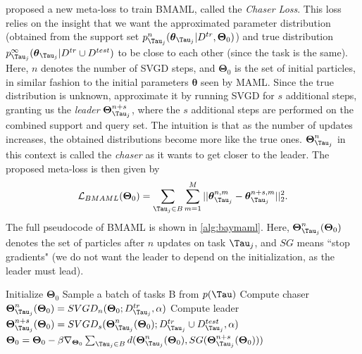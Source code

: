  proposed a new meta-loss to train BMAML, called the \textit{Chaser Loss}. This loss relies on the insight that we want the approximated parameter distribution (obtained from the support set $p^{n}_{\Tau_{j}}(\boldsymbol{\theta}_{\Tau_{j}} | D^{tr}, \boldsymbol{\Theta}_{0})$) and true distribution $p^{\infty}_{\Tau_{j}}(\boldsymbol{\theta}_{\Tau_{j}}|D^{tr} \cup D^{test})$ to be close to each other (since the task is the same). Here, $n$ denotes the number of SVGD steps, and $\boldsymbol{\Theta}_{0}$ is the set of initial particles, in similar fashion to the initial parameters $\boldsymbol{\theta}$ seen by MAML. 
Since the true distribution is unknown,  approximate it by running SVGD for $s$ additional steps, granting us the \textit{leader} $\boldsymbol{\Theta}^{n + s}_{\Tau_{j}}$, where the $s$ additional steps are performed on the combined support and query set. The intuition is that as the number of updates increases, the obtained distributions become more like the true ones. $\boldsymbol{\Theta}^{n}_{\Tau_{j}}$ in this context is called the \textit{chaser} as it wants to get closer to the leader. The proposed meta-loss is then given by 
\begin{align}
    \mathcal{L}_{BMAML}(\boldsymbol{\Theta}_{0}) = \sum_{\Tau_{j} \in B}\sum_{m=1}^{M} || \boldsymbol{\theta}_{\Tau_{j}}^{n,m} - \boldsymbol{\theta}_{\Tau_{j}}^{n+s,m} ||^{2}_{2}. 
\end{align} 
The full pseudocode of BMAML is shown in \autoref{alg:baymaml}. Here, $\boldsymbol{\Theta}^{n}_{\Tau_{j}}(\boldsymbol{\Theta}_{0})$ denotes the set of particles after $n$ updates on task $\Tau_{j}$, and $SG$ means ``stop gradients" (we do not want the leader to depend on the initialization, as the leader must lead).  
\begin{algorithm}
\caption{BMAML by }\label{alg:baymaml}
\begin{algorithmic}[1]
\State Initialize $\boldsymbol{\Theta}_{0}$
\State Sample a batch of tasks B from $p(\Tau)$
\State Compute chaser $\boldsymbol{\Theta}^{n}_{\Tau_{j}}(\boldsymbol{\Theta}_{0}) = SVGD_{n}(\boldsymbol{\Theta}_{0}; D^{tr}_{\Tau_{j}}, \alpha)$
\State Compute leader $\boldsymbol{\Theta}^{n+s}_{\Tau_{j}}(\boldsymbol{\Theta}_{0}) = SVGD_{s}(\boldsymbol{\Theta}^{n}_{\Tau_{j}}(\boldsymbol{\Theta}_{0}); D^{tr}_{\Tau_{j}} \cup D^{test}_{\Tau_j}, \alpha)$
\EndFor
\State $\boldsymbol{\Theta}_{0} = \boldsymbol{\Theta}_{0} - \beta \nabla_{\boldsymbol{\Theta}_{0}}\sum_{\Tau_{j} \in B} d(\boldsymbol{\Theta}^{n}_{\Tau_{j}}(\boldsymbol{\Theta}_{0}), SG(\boldsymbol{\Theta}^{n+s}_{\Tau_{j}}(\boldsymbol{\Theta}_{0})))$
\EndFor
\end{algorithmic}
\end{algorithm}
